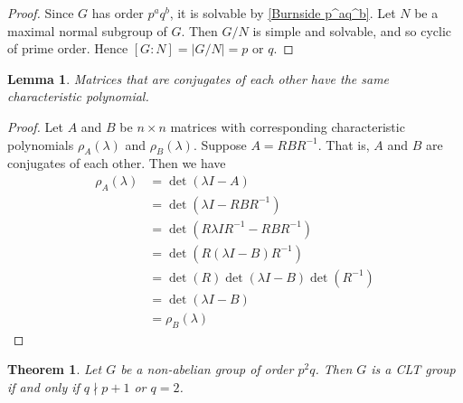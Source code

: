 \documentclass[12pt]{report}
\theoremstyle{newthm}
\newtheorem{Theorem}[lem]{Theorem}
\newtheorem{Lemma}[lem]{Lemma}
\begin{document}
\begin{proof}
Since $G$ has order $p^aq^b$, it is solvable by \cref{Burnside p^aq^b}. Let $N$ be a maximal normal subgroup of $G$. Then $G/N$ is simple and solvable, and so cyclic of prime order. Hence $[G:N]=|G/N|=p$ or $q$.
\end{proof}

\begin{Lemma}\label{conj mat}
Matrices that are conjugates of each other have the same characteristic polynomial. 
\end{Lemma}

\begin{proof}
Let $A$ and $B$ be $n\times n$ matrices with corresponding characteristic polynomials $\rho_A(\lambda)$ and $\rho_B(\lambda)$. Suppose $A=RBR^{-1}$. That is, $A$ and $B$ are conjugates of each other. Then we have
\begin{align*}
    \rho_A(\lambda) &= \det(\lambda I-A) \\
    &=\det(\lambda I -RBR^{-1})\\
    &= \det(R\lambda I R^{-1} - RBR^{-1})\\
    &= \det(R(\lambda I - B)R^{-1})\\
    &= \det(R)\det(\lambda I - B)\det(R^{-1})\\
    &= \det(\lambda I - B)\\
    &= \rho_B(\lambda)
\end{align*}
\end{proof}

\begin{Theorem}\label{p^2q}
Let $G$ be a non-abelian group of order $p^2q$. Then $G$ is a CLT group if and only if $q\nmid p+1$ or $q=2$.
\end{Theorem}
\end{document}
